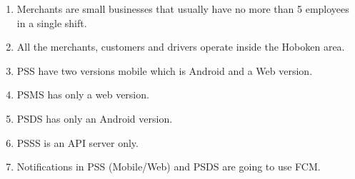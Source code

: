 \begin{enumerate}[resume, label=AS-\arabic*]
    \item Merchants are small businesses that usually have no more 
    than 5 employees in a single shift.
    \item All the merchants, customers and drivers operate inside the 
    Hoboken area.
    \item PSS have two versions mobile which is Android and a Web version.
    \item PSMS has only a web version.
    \item PSDS has only an Android version.
    \item PSSS is an API server only.
    \item Notifications in PSS (Mobile/Web) and PSDS are going to use FCM.
\end{enumerate}
\pagebreak
